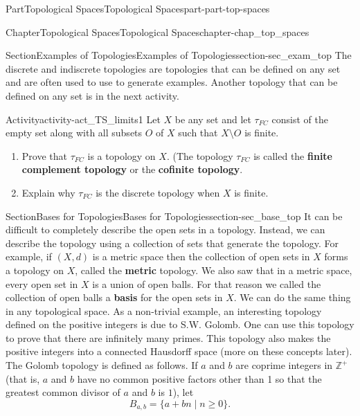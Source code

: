 \documentclass[oneside,10pt,]{book}
\newcommand{\terminology}[1]{\textbf{#1}}
\numberwithin{equation}{chapter}
\newcommand{\Z}{\mathbb{Z}}
\begin{document}
\begin{partptx}{Part}{Topological Spaces}{}{Topological Spaces}{}{}{part-part-top-spaces}
\begin{chapterptx}{Chapter}{Topological Spaces}{}{Topological Spaces}{}{}{chapter-chap_top_spaces}
\begin{sectionptx}{Section}{Examples of Topologies}{}{Examples of Topologies}{}{}{section-sec_exam_top}
The discrete and indiscrete topologies are topologies that can be defined on any set and are often used to use to generate examples. Another topology that can be defined on any set is in the next activity.%
\begin{activity}{Activity}{}{activity-act_TS_limits1}%
Let \(X\) be any set and let \(\tau_{FC}\) consist of the empty set along with all subsets \(O\) of \(X\) such that \(X \setminus O\) is finite.%
\begin{enumerate}[font=\bfseries,label=(\alph*),ref=\alph*]%
\item{}Prove that \(\tau_{FC}\) is a topology on \(X\). (The topology \(\tau_{FC}\) is called the \terminology{finite complement topology} or the \terminology{cofinite topology}. %
\item{}Explain why \(\tau_{FC}\) is the discrete topology when \(X\) is finite.%
\end{enumerate}%
\end{activity}%
\end{sectionptx}
%
%
\typeout{************************************************}
\typeout{************************************************}
%
\begin{sectionptx}{Section}{Bases for Topologies}{}{Bases for Topologies}{}{}{section-sec_base_top}
It can be difficult to completely describe the open sets in a topology. Instead, we can describe the topology using a collection of sets that generate the topology. For example, if \((X,d)\) is a metric space then the collection of open sets in \(X\) forms a topology on \(X\), called the \terminology{metric} topology. We also saw that in a metric space, every open set in \(X\) is a union of open balls. For that reason we called the collection of open balls a \terminology{basis} for the open sets in \(X\). We can do the same thing in any topological space. As a non-trivial example, an interesting topology defined on the positive integers is due to S.W. Golomb. One can use this topology to prove that there are infinitely many primes. This topology also makes the positive integers into a connected Hausdorff space (more on these concepts later). The Golomb topology is defined as follows. If \(a\) and \(b\) are coprime integers in \(\Z^+\) (that is, \(a\) and \(b\) have no common positive factors other than 1 so that the greatest common divisor of \(a\) and \(b\) is \(1\)), let%
\begin{equation*}
B_{a,b} = \{a+bn \mid n \geq 0\}\text{.}

\end{equation*}
\end{sectionptx}
\end{chapterptx}
\end{partptx}
\end{document}
